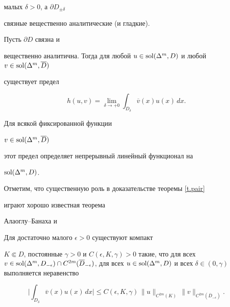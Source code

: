 малых $\delta >0$, а $\partial D_{\pm \delta}$ 


связные вещественно аналитические (и гладкие).





\begin{thm} \label{t.pair}


Пусть $\partial D$ связна и


вещественно аналитична. Тогда для любой $u \in


\sol (\Delta ^m,D)$ и любой $v \in \sol (\Delta ^m, \overline D)$


существует предел


$$


h (u,v) = \lim_{\delta \to +0} \int_{D_\delta}


\overline {v}(x) u (x) \, dx .


$$


Для всякой фиксированной функции


$v \in \operatorname{sol} (\Delta ^m, \overline D)$


этот предел определяет непрерывный линейный функционал на


$\operatorname{sol} (\Delta ^m,D)$.


\end{thm}





Отметим, что существенную роль в доказательстве теоремы \ref{t.pair}


играют хорошо известная теорема


Алаоглу--Банаха и 





\begin{lem} \label{l.estim}


Для достаточно малого $\epsilon >0$ существуют компакт


$K\Subset D$, постоянные $\gamma >0$ и $C(\epsilon, K, \gamma)


>0$ такие, что для всех $v \in \sol (\Delta ^m, D_{-\epsilon}) \cap


C^{2m}(\overline D_{-\epsilon})$, для всех $u \in


\sol (\Delta ^m , D)$ и всех $\delta \in (0,\gamma)$ выполняется неравенство


$$


\bigg| \int_ {D_\delta} \overline{v} (x) u(x)\, dx


\bigg| \leq C(\epsilon, K, \gamma) \, \| u\| _{C^{2m}(K)} \,


\| v\| _{C^{2m}(\overline D_{-\epsilon})}.


$$


\end{lem}






